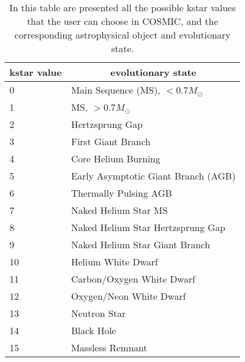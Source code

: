 \chapter{}
\begin{table}
    \caption{In this table are presented all the possible kstar values that the user can choose in COSMIC, and the corresponding astrophysical object and evolutionary state.}\label{tab: kstar values}
    \begin{center}
        \begin{tabular}[]{l|l}
            \toprule
            \multicolumn{1}{c|}{\textbf{kstar value}} & 
            \multicolumn{1}{c}{\textbf{evolutionary state}} \\
            \midrule
            0 & Main Sequence (MS), $< 0.7 M_\odot$ \\
            1 & MS, $>0.7 M_\odot$ \\
            2 & Hertzsprung Gap \\
            3 & First Giant Branch \\
            4 & Core Helium Burning \\
            5 & Early Asymptotic Giant Branch (AGB) \\
            6 & Thermally Pulsing AGB \\
            7 & Naked Helium Star MS \\
            8 & Naked Helium Star Hertzsprung Gap \\
            9 & Naked Helium Star Giant Branch \\
            10 & Helium White Dwarf \\
            11 & Carbon/Oxygen White Dwarf \\
            12 & Oxygen/Neon White Dwarf \\
            13 & Neutron Star \\
            14 & Black Hole \\
            15 & Massless Remnant \\          
            \bottomrule
        \end{tabular}
    \end{center}
\end{table}


% 
% 
% 





